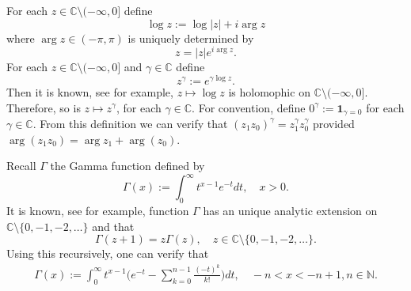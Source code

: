 \documentclass[12pt]{amsart}
\theoremstyle{plain}
\theoremstyle{definition}
\numberwithin{equation}{section}
\begin{document}
	For each $z\in \mathbb C\setminus (-\infty,0]$ define
\[
	\log z := \log |z| + i \arg z
\]
	where $\arg z \in (-\pi,\pi)$ is uniquely determined by
\[
	z = |z|e^{i \arg z}.
\] 	
	For each $z\in \mathbb C\setminus (-\infty,0]$ and $\gamma \in \mathbb C$ define
\[
	z^\gamma := e^{\gamma \log z}.
\]
	Then it is known, see \cite[Theorem 6.1]{SteinShakarchi2003Complex} for example, $z\mapsto \log z$ is holomophic on $\mathbb C\setminus (-\infty,0]$.
	Therefore, so is $z\mapsto z^\gamma$, for each $\gamma \in \mathbb C$.
	For convention, define $0^\gamma := \mathbf 1_{\gamma = 0}$ for each $\gamma \in \mathbb C$.
    From this definition we can verify that $(z_1z_0)^\gamma = z_1^\gamma z_0^\gamma$ provided $\arg (z_1z_0)=\arg z_1 + \arg(z_0)$.


    Recall $\Gamma$ the Gamma function defined by
\begin{equation}
    \Gamma (x) := \int_0^\infty t^{x-1} e^{-t}dt,
    \quad x>0.
\end{equation}
	It is known, see \cite[Theorem 6.1.3 and its following remark]{SteinShakarchi2003Complex} for example, function $\Gamma$ has an unique analytic extension on $\mathbb C\setminus\{0, -1,-2,\dots\}$ and that
\[
	\Gamma(z+1) = z \Gamma(z),\quad z\in \mathbb C\setminus\{0, -1,-2,\dots\}.
\]
	Using this recursively, one can verify that
\begin{align}
\label{eq: definition of Gamma function}
    \Gamma(x)
    := \int_0^\infty t^{x-1} \Big(e^{-t} - \sum_{k=0}^{n-1} \frac{(-t)^k}{k!}\Big) dt,
    \quad -n< x< -n+1, n\in \mathbb N.
\end{align}
\end{document}
